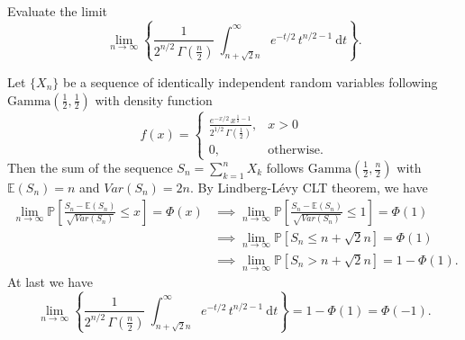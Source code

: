\begin{example}
    Evaluate the limit
    \[
        \lim_{n \to \infty} \left\{ \frac{1}{\displaystyle 2^{n/2} \, \Gamma \left( \frac{n}{2}\right)} \> \int^{\infty}_{n + \sqrt{2}n} e^{-t/2} \, t^{n/2 - 1} \> \mathrm{d}t \right\}.
    \]
\end{example}
\begin{solution}
    Let $\{X_n\}$ be a sequence of identically independent random variables following $\text{Gamma}(\frac{1}{2}, \frac{1}{2})$ 
    with density function 
    \[
        f(x) = \begin{cases}
            \displaystyle \frac{e^{-x/2}\, x^{\frac{1}{2} - 1}}{2^{1/2} \, \Gamma(\frac{1}{2})}, & x > 0\\
            0, & \text{otherwise}.
        \end{cases}
    \]
    Then the sum of the sequence $S_n = \sum^n_{k=1} X_k$ follows $\text{Gamma}(\frac{1}{2}, \frac{n}{2})$ with 
    $\mathbb{E}(S_n) = n$ and $Var(S_n) = 2n$. By Lindberg-L\'evy CLT theorem, we have
    \begin{align*}
        \lim_{n \to \infty} \mathbb{P} \left[ \frac{S_n - \mathbb{E}(S_n)}{\sqrt{Var(S_n)}} \leq x \right] = \Phi(x)
        &\implies \lim_{n \to \infty} \mathbb{P} \left[ \frac{S_n - \mathbb{E}(S_n)}{\sqrt{Var(S_n)}} \leq 1 \right] = \Phi(1)\\
        &\implies \lim_{n \to \infty} \mathbb{P} \left[ S_n \leq n + \sqrt{2}n \right] = \Phi(1)\\
        &\implies \lim_{n \to \infty} \mathbb{P} \left[ S_n > n + \sqrt{2}n \right] = 1 - \Phi(1).
    \end{align*}
    At last we have 
    \[
    \lim_{n \to \infty} \left\{ \frac{1}{\displaystyle 2^{n/2} \, \Gamma \left( \frac{n}{2}\right)} \> \int^{\infty}_{n + \sqrt{2}n} e^{-t/2} \, t^{n/2 - 1} \> \mathrm{d}t \right\} = 1 - \Phi(1) = \Phi(-1).
    \]
\end{solution}

